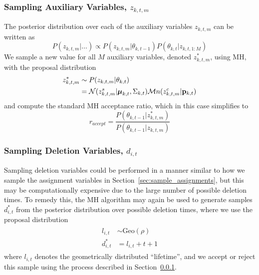 \documentclass[twocolumn, final]{svjour3}
\begin{document}

\subsubsection{Sampling Auxiliary Variables, $z_{k,t,m}$}
\label{sec:sample_aux_vars}

The posterior distribution over each of the auxiliary variables $z_{k,t,m}$ can be written as
\begin{equation}
\label{stationary_pdf}
P(z_{k,t,m} | \ldots) \propto  P(z_{k,t,m} | \theta_{k,t-1}) P(\theta_{k,t} | z_{k,t,1:M})
\end{equation}
We sample a new value for all $M$ auxiliary variables, denoted $z_{k,t,m}^{*}$, using MH, with the proposal distribution
\begin{align}
\begin{split}
\label{proposal_distro}
z_{k,t,m}^{*}  &\sim  P(z_{k,t,m} | \theta_{k,t}) \\
&= \mathcal{N}(z_{k,t,m}^{s} | \boldsymbol{\mu}_{k,t}, \Sigma_{k,t}) \mathcal{M}n(z_{k,t,m}^{c} | \bold{p}_{k,t})
\end{split}
\end{align}
and compute the standard MH acceptance ratio, which in this case simplifies to 
\begin{equation}
\label{accept_ratio}
r_{accept} = \frac{P(\theta_{k,t-1} | z_{k,t,m}^{*})}{P(\theta_{k,t-1} | z_{k,t,m})}
\end{equation}



\subsubsection{Sampling Deletion Variables, $d_{i,t}$}
Sampling deletion variables could be performed in a manner similar to how we sample the assignment variables in Section~\ref{sec:sample_assignments}, but this may be computationally expensive due to the large number of possible deletion times. To remedy this, the MH algorithm may again be used to generate samples $d_{i,t}^{*}$ from the posterior distribution over possible deletion times, where we use the proposal distribution
\begin{align}
\begin{split}
l_{i,t}  &\sim  \text{Geo}(\rho)  \\
d_{i,t}^{*}  &= l_{i,t} + t + 1
\end{split}
\end{align}
where $l_{i,t}$ denotes the geometrically distributed ``lifetime'', and we accept or reject this sample using the process described in Section~\ref{sec:sample_aux_vars}.
\end{document}
